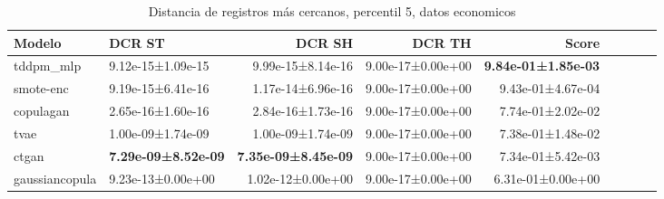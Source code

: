 \begin{table}[H]
\centering
\fontsize{10}{14}\selectfont
\caption{Distancia de registros más cercanos, percentil 5, datos economicos}
\label{table-dcr-economicos-b}
\begin{tabular}{|l|l|r|r|r|r|r|r|r|}
\hline
\rowcolor[gray]{0.8}
Modelo & DCR ST & DCR SH & DCR TH & \textbf{Score} \\
\hline tddpm\_mlp & 9.12e-15±1.09e-15 & 9.99e-15±8.14e-16 & 9.00e-17±0.00e+00 & \bfseries 9.84e-01±1.85e-03 \\
\hline smote-enc & 9.19e-15±6.41e-16 & 1.17e-14±6.96e-16 & 9.00e-17±0.00e+00 & 9.43e-01±4.67e-04 \\
\hline copulagan & \cellcolor[rgb]{0.9, 0.54, 0.52} 2.65e-16±1.60e-16 & \cellcolor[rgb]{0.9, 0.54, 0.52} 2.84e-16±1.73e-16 & 9.00e-17±0.00e+00 & 7.74e-01±2.02e-02 \\
\hline tvae & 1.00e-09±1.74e-09 & 1.00e-09±1.74e-09 & 9.00e-17±0.00e+00 & 7.38e-01±1.48e-02 \\
\hline ctgan & \bfseries 7.29e-09±8.52e-09 & \bfseries 7.35e-09±8.45e-09 & 9.00e-17±0.00e+00 & 7.34e-01±5.42e-03 \\
\hline gaussiancopula & 9.23e-13±0.00e+00 & 1.02e-12±0.00e+00 & 9.00e-17±0.00e+00 & \cellcolor[rgb]{0.9, 0.54, 0.52} 6.31e-01±0.00e+00 \\
\hline
\end{tabular}
\end{table}
